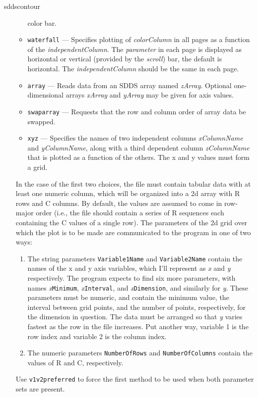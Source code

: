 \begin{sddsprog}{sddscontour}
\begin{itemize}
\begin{itemize}
        color bar.
        \item \verb|waterfall| --- Specifies plotting of {\em colorColumn} in all pages as a function of the
        {\em independentColumn}. The {\em parameter} in each page is displayed as horizontal or vertical (provided
        by the {\em scroll}) bar, the default is horizontal. The {\em independentColumn} should be the same in
        each page.
        \item \verb|array| --- Reads data from an SDDS array named {\em zArray}.  Optional one-dimensional arrays
          {\em xArray} and {\em yArray} may be given for axis values.
        \item \verb|swaparray| --- Requests that the row and column order of array data be swapped.
        \item \verb|xyz| --- Specifies the names of two independent columns {\em xColumnName} and {\em yColumnName}, along with
          a third dependent column {\em zColumnName} that is plotted as a function of the others.
          The x and y values must form a grid.
        \end{itemize}

        In the case of the first two choices, the file must contain
tabular data with at least one numeric column, which will be organized
into a 2d array with R rows and C columns.  By default, the values are
assumed to come in row-major order (i.e., the file should contain a
series of R sequences each containing the C values of a single row).
The parameters of the 2d grid over which the plot is to be made are
communicated to the program in one of two ways:

\begin{enumerate}

\item The string parameters \verb|Variable1Name| and \verb|Variable2Name| contain the names of the
x and y axis variables, which I'll represent as {\em x} and {\em y} respectively.  The program expects to find
six more parameters, with names {\em x}\verb|Minimum|, {\em x}\verb|Interval|, and {\em x}\verb|Dimension|,
and similarly for {\em y}.  These parameters must be numeric, and contain the minimum value, the interval
between grid points, and the number of points, respectively, for the dimension in question.
The data must be arranged so that {\em y} varies fastest as the row in the file increases.  Put another
way, variable 1 is the row index and variable 2 is the column index.
\item The numeric parameters \verb|NumberOfRows| and \verb|NumberOfColumns| contain the values of R and
C, respectively.
\end{enumerate}
Use \verb|v1v2preferred| to force the first method to be used when both parameter sets are present.


\end{itemize}
\end{sddsprog}

